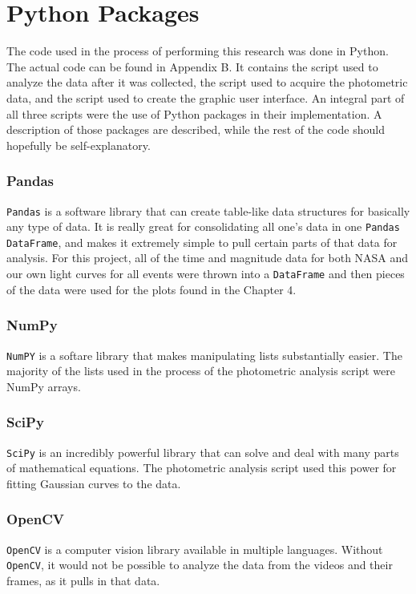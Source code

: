 \appendix
\chapter{Python Packages}
The code used in the process of performing this research was done in Python. The actual code can be found in Appendix B. It contains the script used to analyze the data after it was collected, the script used to acquire the photometric data, and the script used to create the graphic user interface. An integral part of all three scripts were the use of Python packages in their implementation. A description of those packages are described, while the rest of the code should hopefully be self-explanatory.

\subsection*{Pandas}

\texttt{Pandas} is a software library that can create table-like data structures for basically any type of data. It is really great for consolidating all one's data in one \texttt{Pandas DataFrame}, and makes it extremely simple to pull certain parts of that data for analysis. For this project, all of the time and magnitude data for both NASA and our own light curves for all events were thrown into a \texttt{DataFrame} and then pieces of the data were used for the plots found in the Chapter 4.


\subsection*{NumPy}

\texttt{NumPY} is a softare library that makes manipulating lists substantially easier. The majority of the lists used in the process of the photometric analysis script were NumPy arrays. 

\subsection*{SciPy}

\texttt{SciPy} is an incredibly powerful library that can solve and deal with many parts of mathematical equations. The photometric analysis script used this power for fitting Gaussian curves to the data.

\subsection*{OpenCV}
\texttt{OpenCV} is a computer vision library available in multiple languages. Without \texttt{OpenCV}, it would not be possible to analyze the data from the videos and their frames, as it pulls in that data.

